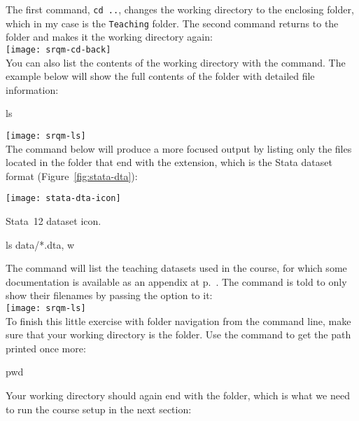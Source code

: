 	The first command, \texttt{cd ..}, changes the working directory to the enclosing folder, which in my case is the \texttt{Teaching} folder. The second command returns to the \SRQM folder and makes it the working directory again:\\[1em]%
		
	\texttt{[image: srqm-cd-back]}\\[1em]
	
	You can also list the contents of the working directory with the  command. The example below will show the full contents of the \SRQM folder with detailed file information:%
	
		\begin{docspec}
			ls
		\end{docspec}

		\texttt{[image: srqm-ls]}\\[1em]
			
	The  command below will produce a more focused output by listing only the files located in the \data folder that end with the  extension, which is the Stata dataset format (Figure~\ref{fig:stata-dta}):%

		\begin{marginfigure}
			\texttt{[image: stata-dta-icon]}
			\caption{Stata~12 dataset icon.}
			\label{fig:stata-dta}
		\end{marginfigure}

		\begin{docspec}
			ls data/*.dta, w
		\end{docspec}
			 
	The command will list the teaching datasets used in the course, for which some documentation is available as an appendix at p.~\pageref{ch:data-sources}. The  command is told to only show their filenames by passing the  option to it:\\[1em]%
 
		\texttt{[image: srqm-ls]}\\[1em]
	
	To finish this little exercise with folder navigation from the command line, make sure that your working directory is the \SRQM folder. Use the  command to get the path printed once more:%
	
		\begin{docspec}
			pwd
		\end{docspec}
	
	Your working directory should again end with the \SRQM folder, which is what we need to run the course setup in the next section:\\[1em]%
	
